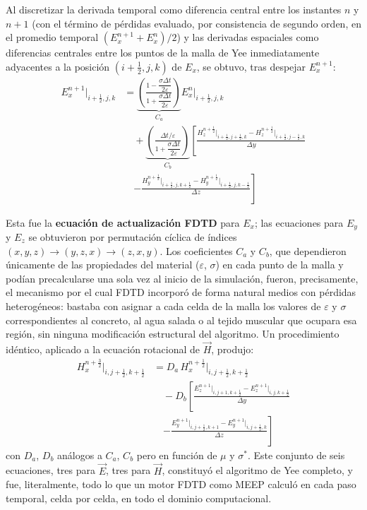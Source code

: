 Al discretizar la derivada temporal como diferencia central entre los instantes $n$ y $n+1$ (con el término de pérdidas evaluado, por consistencia de segundo orden, en el promedio temporal $(E_x^{n+1}+E_x^n)/2$) y las derivadas espaciales como diferencias centrales entre los puntos de la malla de Yee inmediatamente adyacentes a la posición $(i+\frac{1}{2}, j, k)$ de $E_x$, se obtuvo, tras despejar $E_x^{n+1}$:
\begin{equation}
\begin{split}
    E_x^{n+1}\Big|_{i+\frac{1}{2}, j, k} &= \underbrace{\left(\frac{1-\dfrac{\sigma\Delta t}{2\varepsilon}}{1+\dfrac{\sigma\Delta t}{2\varepsilon}}\right)}_{C_a} E_x^{n}\Big|_{i+\frac{1}{2}, j, k} \\
    &\quad + \underbrace{\left(\frac{\Delta t/\varepsilon}{1+\dfrac{\sigma\Delta t}{2\varepsilon}}\right)}_{C_b} \left[ \frac{H_z^{n+\frac{1}{2}}\big|_{i+\frac{1}{2}, j+\frac{1}{2}, k} - H_z^{n+\frac{1}{2}}\big|_{i+\frac{1}{2}, j-\frac{1}{2}, k}}{\Delta y} \right. \\
    &\quad \left. - \frac{H_y^{n+\frac{1}{2}}\big|_{i+\frac{1}{2}, j, k+\frac{1}{2}} - H_y^{n+\frac{1}{2}}\big|_{i+\frac{1}{2}, j, k-\frac{1}{2}}}{\Delta z} \right]
\end{split}
\end{equation}

Esta fue la \textbf{ecuación de actualización FDTD} para $E_x$; las ecuaciones para $E_y$ y $E_z$ se obtuvieron por permutación cíclica de índices $(x, y, z)\to(y, z, x)\to(z, x, y)$. Los coeficientes $C_a$ y $C_b$, que dependieron únicamente de las propiedades del material ($\varepsilon$, $\sigma$) en cada punto de la malla y podían precalcularse una sola vez al inicio de la simulación, fueron, precisamente, el mecanismo por el cual FDTD incorporó de forma natural medios con pérdidas heterogéneos: bastaba con asignar a cada celda de la malla los valores de $\varepsilon$ y $\sigma$ correspondientes al concreto, al agua salada o al tejido muscular que ocupara esa región, sin ninguna modificación estructural del algoritmo. Un procedimiento idéntico, aplicado a la ecuación rotacional de $\vec{H}$, produjo:
\begin{equation}
\begin{split}
    H_x^{n+\frac{3}{2}}\Big|_{i, j+\frac{1}{2}, k+\frac{1}{2}} &= D_a\, H_x^{n+\frac{1}{2}}\Big|_{i, j+\frac{1}{2}, k+\frac{1}{2}} \\
    &\quad - D_b \left[ \frac{E_z^{n+1}\big|_{i, j+1, k+\frac{1}{2}} - E_z^{n+1}\big|_{i, j, k+\frac{1}{2}}}{\Delta y} \right. \\
    &\quad \left. - \frac{E_y^{n+1}\big|_{i, j+\frac{1}{2}, k+1} - E_y^{n+1}\big|_{i, j+\frac{1}{2}, k}}{\Delta z} \right]
\end{split}
\end{equation}
con $D_a$, $D_b$ análogos a $C_a$, $C_b$ pero en función de $\mu$ y $\sigma^*$. Este conjunto de seis ecuaciones, tres para $\vec{E}$, tres para $\vec{H}$, constituyó el algoritmo de Yee completo, y fue, literalmente, todo lo que un motor FDTD como MEEP calculó en cada paso temporal, celda por celda, en todo el dominio computacional.

